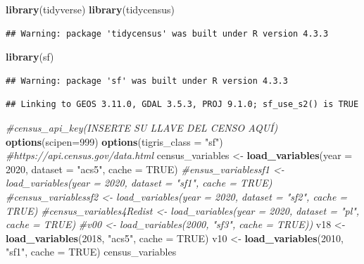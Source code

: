 \documentclass[
]{article}
\newenvironment{Shaded}{\begin{snugshade}}{\end{snugshade}}
\newcommand{\AttributeTok}[1]{\textcolor[rgb]{0.13,0.29,0.53}{#1}}
\newcommand{\CommentTok}[1]{\textcolor[rgb]{0.56,0.35,0.01}{\textit{#1}}}
\newcommand{\ConstantTok}[1]{\textcolor[rgb]{0.56,0.35,0.01}{#1}}
\newcommand{\DecValTok}[1]{\textcolor[rgb]{0.00,0.00,0.81}{#1}}
\newcommand{\FunctionTok}[1]{\textcolor[rgb]{0.13,0.29,0.53}{\textbf{#1}}}
\newcommand{\NormalTok}[1]{#1}
\newcommand{\OtherTok}[1]{\textcolor[rgb]{0.56,0.35,0.01}{#1}}
\newcommand{\StringTok}[1]{\textcolor[rgb]{0.31,0.60,0.02}{#1}}
\begin{document}
\begin{Shaded}
\begin{Highlighting}[]
\FunctionTok{library}\NormalTok{(tidyverse)}
\FunctionTok{library}\NormalTok{(tidycensus)}
\end{Highlighting}
\end{Shaded}

\begin{verbatim}
## Warning: package 'tidycensus' was built under R version 4.3.3
\end{verbatim}

\begin{Shaded}
\begin{Highlighting}[]
\FunctionTok{library}\NormalTok{(sf)}
\end{Highlighting}
\end{Shaded}

\begin{verbatim}
## Warning: package 'sf' was built under R version 4.3.3
\end{verbatim}

\begin{verbatim}
## Linking to GEOS 3.11.0, GDAL 3.5.3, PROJ 9.1.0; sf_use_s2() is TRUE
\end{verbatim}

\begin{Shaded}
\begin{Highlighting}[]
\CommentTok{\#census\_api\_key(INSERTE SU LLAVE DEL CENSO AQUÍ)}
\FunctionTok{options}\NormalTok{(}\AttributeTok{scipen=}\DecValTok{999}\NormalTok{)}
\FunctionTok{options}\NormalTok{(}\AttributeTok{tigris\_class =} \StringTok{"sf"}\NormalTok{)}
\CommentTok{\#https://api.census.gov/data.html}
\NormalTok{census\_variables }\OtherTok{\textless{}{-}} \FunctionTok{load\_variables}\NormalTok{(}\AttributeTok{year =} \DecValTok{2020}\NormalTok{, }\AttributeTok{dataset =} \StringTok{"acs5"}\NormalTok{, }\AttributeTok{cache =} \ConstantTok{TRUE}\NormalTok{)}
\CommentTok{\#ensus\_variablessf1 \textless{}{-} load\_variables(year = 2020, dataset = "sf1", cache = TRUE)}
\CommentTok{\#census\_variablessf2 \textless{}{-} load\_variables(year = 2020, dataset = "sf2", cache = TRUE)}
\CommentTok{\#census\_variables4Redist \textless{}{-} load\_variables(year = 2020, dataset = "pl", cache = TRUE)}
\CommentTok{\#v00 \textless{}{-} load\_variables(2000, "sf3", cache = TRUE))}
\NormalTok{v18 }\OtherTok{\textless{}{-}} \FunctionTok{load\_variables}\NormalTok{(}\DecValTok{2018}\NormalTok{, }\StringTok{"acs5"}\NormalTok{, }\AttributeTok{cache =} \ConstantTok{TRUE}\NormalTok{)}
\NormalTok{v10 }\OtherTok{\textless{}{-}} \FunctionTok{load\_variables}\NormalTok{(}\DecValTok{2010}\NormalTok{, }\StringTok{"sf1"}\NormalTok{, }\AttributeTok{cache =} \ConstantTok{TRUE}\NormalTok{)}
\NormalTok{census\_variables}
\end{Highlighting}
\end{Shaded}
\end{document}
